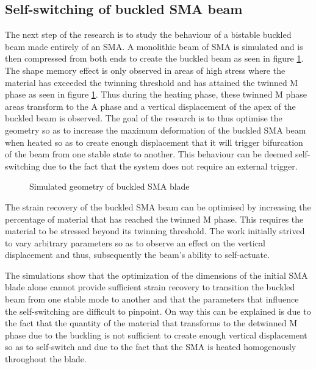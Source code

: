 \subsection{Self-switching of buckled SMA beam}
The next step of the research is to study the behaviour of a bistable buckled beam made entirely of an SMA. A monolithic beam of SMA is simulated and is then compressed from both ends to create the buckled beam as seen in figure \ref{fig:FigSMABlade}. The shape memory effect is only observed in areas of high stress where the material has exceeded the twinning threshold and has attained the twinned M phase as seen in figure \ref{fig:FigSMABlade}. Thus during the heating phase, these twinned M phase areas transform to the A phase and a vertical displacement of the apex of the buckled beam is observed. The goal of the research is to thus optimise the geometry so as to increase the maximum deformation of the buckled SMA beam when heated so as to create enough displacement that it will trigger bifurcation of the beam from one stable state to another. This behaviour can be deemed self-switching due to the fact that the system does not require an external trigger.

\begin{figure}
	\centering
  {\tiny
	\def\svgwidth{0.4\textwidth}
	
  }
	\caption{Simulated geometry of buckled SMA blade}
	\vspace{-10pt}
	\label{fig:FigSMABlade}
\end{figure}

The strain recovery of the buckled SMA beam can be optimised by increasing the percentage of material that has reached the twinned M phase. This requires the material to be stressed beyond its twinning threshold. The work initially strived to vary arbitrary parameters so as to observe an effect on the vertical displacement and thus, subsequently the beam's ability to self-actuate.

The simulations show that the optimization of the dimensions of the initial SMA blade alone cannot provide sufficient strain recovery to transition the buckled beam from one stable mode to another and that the parameters that influence the self-switching are difficult to pinpoint. On way this can be explained is due to the fact that the quantity of the material that transforms to the detwinned M phase due to the buckling is not sufficient to create enough vertical displacement so as to self-switch and due to the fact that the SMA is heated homogenously throughout the blade.

